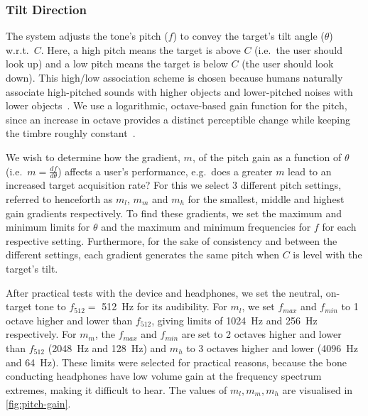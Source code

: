\documentclass{llncs}
\begin{document}
\subsubsection{Tilt Direction}

The system adjusts the tone's pitch ($f$) to convey the target's tilt angle ($\theta$) w.r.t.\ $C$. 
Here, a high pitch means the target is above $C$ (i.e.\ the user should look up) and a low pitch means the target is below $C$ (the user should look down).
This high/low association scheme is chosen because humans naturally associate high-pitched sounds with higher objects and lower-pitched noises with lower objects~\cite{pratt1930spatial,blauert1997spatial}.
We use a logarithmic, octave-based gain function for the pitch, since an increase in octave provides a distinct perceptible change while keeping the timbre roughly constant~\cite{shepard1964circularity}.

We wish to determine how the gradient, $m$, of the pitch gain as a function of $\theta$ (i.e.\ $m = \frac{df}{d\theta}$) affects a user's performance, e.g.\ does a greater $m$ lead to an increased target acquisition rate?
For this we select 3 different pitch settings, referred to henceforth as $m_l$, $m_m$ and $m_h$ for the smallest, middle and highest gain gradients respectively. 
To find these gradients, we set the maximum and minimum limits for $\theta$ and the maximum and minimum frequencies for $f$ for each respective setting.
Furthermore, for the sake of consistency and between the different settings, each gradient generates the same pitch when $C$ is level with the target's tilt. 

After practical tests with the device and headphones, we set the neutral, on-target tone to $f_{512} =$ \SI{512}{\hertz} for its audibility.
For $m_l$, we set $f_{max}$ and $f_{min}$ to 1 octave higher and lower than $f_{512}$, giving limits of \SI{1024}{\hertz} and \SI{256}{\hertz} respectively.
For $m_m$, the $f_{max}$ and $f_{min}$ are set to 2 octaves higher and lower than $f_{512}$ (\SI{2048}{\hertz} and \SI{128}{\hertz}) and $m_h$ to 3 octaves higher and lower (\SI{4096}{\hertz} and \SI{64}{\hertz}).
These limits were selected for practical reasons, because the bone conducting headphones have low volume gain at the frequency spectrum extremes, making it difficult to hear. 
The values of $m_l, m_m, m_h$ are visualised in \cref{fig:pitch-gain}.
\end{document}
